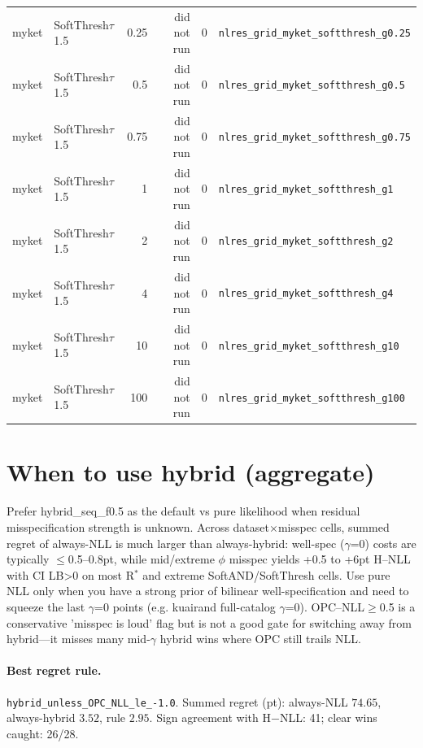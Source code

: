 \documentclass[10pt,a4paper]{article}
\begin{document}
{\begin{longtable}{llrrll}
myket & SoftThresh$\tau$1.5 & 0.25 & did not run & 0 & \texttt{nlres\_grid\_myket\_softthresh\_g0.25} \\
myket & SoftThresh$\tau$1.5 & 0.5 & did not run & 0 & \texttt{nlres\_grid\_myket\_softthresh\_g0.5} \\
myket & SoftThresh$\tau$1.5 & 0.75 & did not run & 0 & \texttt{nlres\_grid\_myket\_softthresh\_g0.75} \\
myket & SoftThresh$\tau$1.5 & 1 & did not run & 0 & \texttt{nlres\_grid\_myket\_softthresh\_g1} \\
myket & SoftThresh$\tau$1.5 & 2 & did not run & 0 & \texttt{nlres\_grid\_myket\_softthresh\_g2} \\
myket & SoftThresh$\tau$1.5 & 4 & did not run & 0 & \texttt{nlres\_grid\_myket\_softthresh\_g4} \\
myket & SoftThresh$\tau$1.5 & 10 & did not run & 0 & \texttt{nlres\_grid\_myket\_softthresh\_g10} \\
myket & SoftThresh$\tau$1.5 & 100 & did not run & 0 & \texttt{nlres\_grid\_myket\_softthresh\_g100} \\
\end{longtable}}
\newpage
\section{When to use hybrid (aggregate)}
Prefer hybrid\_seq\_f0.5 as the default vs pure likelihood when residual misspecification strength is unknown. Across dataset$\times$misspec cells, summed regret of always-NLL is much larger than always-hybrid: well-spec ($\gamma$=0) costs are typically $\le$0.5--0.8pt, while mid/extreme $\phi$ misspec yields +0.5 to +6pt H--NLL with CI LB>0 on most R$^*$ and extreme SoftAND/SoftThresh cells. Use pure NLL only when you have a strong prior of bilinear well-specification and need to squeeze the last $\gamma$=0 points (e.g. kuairand full-catalog $\gamma$=0). OPC--NLL$\ge$0.5 is a conservative 'misspec is loud' flag but is not a good gate for switching away from hybrid---it misses many mid-$\gamma$ hybrid wins where OPC still trails NLL.

\paragraph{Best regret rule.} \texttt{hybrid\_unless\_OPC\_NLL\_le\_-1.0}. Summed regret (pt): always-NLL $74.65$, always-hybrid $3.52$, rule $2.95$. Sign agreement with H$-$NLL: 41; clear wins caught: 26/28.
\end{document}
